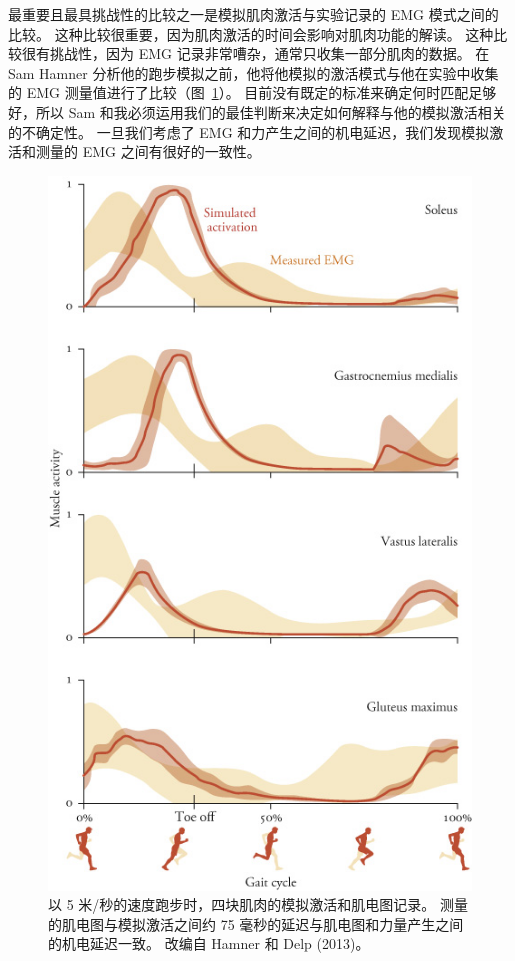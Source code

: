 最重要且最具挑战性的比较之一是模拟肌肉激活与实验记录的 EMG 模式之间的比较。
这种比较很重要，因为肌肉激活的时间会影响对肌肉功能的解读。
这种比较很有挑战性，因为 EMG 记录非常嘈杂，通常只收集一部分肌肉的数据。
在 Sam Hamner 分析他的跑步模拟之前，他将他模拟的激活模式与他在实验中收集的 EMG 测量值进行了比较（图~\ref{fig:10_11}）。
目前没有既定的标准来确定何时匹配足够好，所以 Sam 和我必须运用我们的最佳判断来决定如何解释与他的模拟激活相关的不确定性。
一旦我们考虑了 EMG 和力产生之间的机电延迟，我们发现模拟激活和测量的 EMG 之间有很好的一致性。


\begin{figure}[!htb]
	\centering
	\includegraphics[width=0.8\linewidth]{chap10/10_11}
	\caption{以 5 米/秒的速度跑步时，四块肌肉的模拟激活和肌电图记录。
		测量的肌电图与模拟激活之间约 75 毫秒的延迟与肌电图和力量产生之间的机电延迟一致。
		改编自 Hamner 和 Delp (2013)。 \label{fig:10_11}}
\end{figure}


